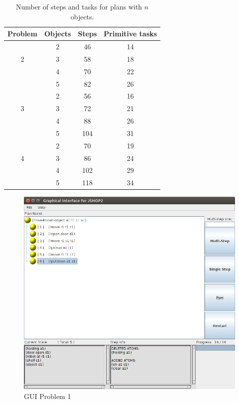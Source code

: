 \documentclass[paper=a4, fontsize=11pt]{scrartcl}
\begin{document}
	
	\begin{table}[h!]
		
		\centering
		
		\begin{tabular}{cccc}
			\toprule   
			
			Problem & Objects & Steps  & Primitive tasks\\
			\midrule
			
			\multirow{3}{*}[-3pt]{2} & {2} & {46} & {14} \\
			
			{} & {3} & {58} & {18} \\
			
			{} & {4} & {70} & {22} \\
			
			{} & {5} & {82} & {26} \\
			
			\midrule
			
			\multirow{3}{*}[-3pt]{3} & {2} & {56} & {16} \\
			
			{} & {3} & {72} & {21} \\
			
			{} & {4} & {88} & {26} \\
			
			{} & {5} & {104} & {31} \\
			
			\midrule
			
			\multirow{3}{*}[-3pt]{4} & {2} & {70} & {19} \\
			
			{} & {3} & {86} & {24} \\
			
			{} & {4} & {102} & {29} \\
			
			{} & {5} & {118} & {34} \\
			
			\bottomrule
		\end{tabular}
		\caption{Number of steps and tasks for plans with $n$ objects.} 
		\label{table:n-objects}
	\end{table}

	
	\begin{figure}[h!]
		\centering
		\includegraphics[width=0.65\linewidth]{images/problem1_gui}
		\caption{GUI Problem 1 }
		\label{fig:probem1_gui}
	\end{figure}
		
\end{document}
